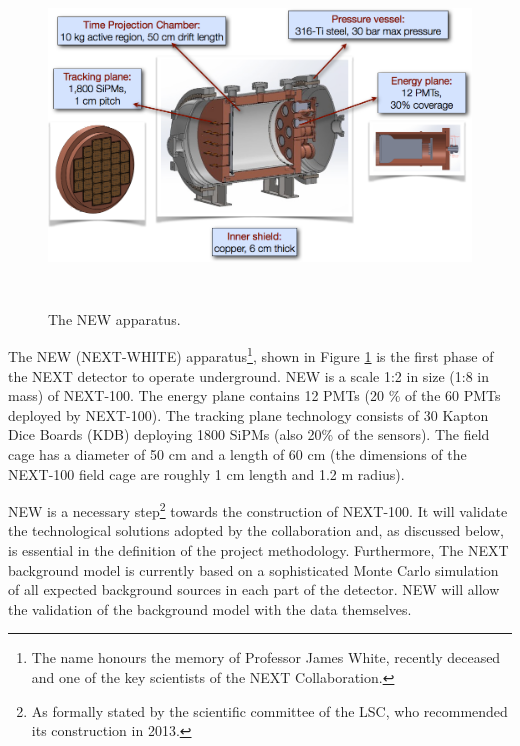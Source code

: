 \begin{figure}
\centering
\includegraphics[height=9cm]{img/NEW.png}
\caption{The NEW apparatus.} \label{fig:NEW}
\end{figure} 

The NEW (NEXT-WHITE) apparatus\footnote{The name honours the memory of Professor James White, recently deceased and one of the key scientists of the NEXT Collaboration.}, shown in Figure \ref{fig:NEW} is the first phase of the NEXT detector to operate underground. NEW 
%
%
is a scale 1:2 in size (1:8 in mass) of NEXT-100. The energy plane contains 12 PMTs (20 \% of the 60 PMTs deployed by NEXT-100). The tracking plane technology consists of 30 Kapton Dice Boards (KDB) deploying 1800 SiPMs (also 20\% of the sensors). The field cage has a diameter of 50 cm and a length of 60 cm (the dimensions of the NEXT-100 field cage are roughly 1 cm length and 1.2 m radius). 

NEW is a necessary step\footnote{As formally stated by the scientific committee of the LSC, who recommended its construction in 2013.} towards the construction of NEXT-100. It will validate the technological solutions adopted by the collaboration and, as discussed below, is essential in the definition of the project methodology. Furthermore, The NEXT background model is currently based on a sophisticated Monte Carlo simulation of all expected background sources in each part of the detector. NEW will allow the validation of the background model with the data themselves. 

